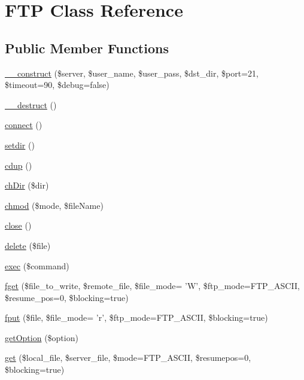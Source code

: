 \hypertarget{class_f_t_p}{\section{F\-T\-P Class Reference}
\label{class_f_t_p}
}
\subsection*{Public Member Functions}
\begin{DoxyCompactItemize}
\item 
\hyperlink{class_f_t_p_a6add9ef3064ccab01141f0c17a4ce7be}{\-\_\-\-\_\-construct} (\$server, \$user\-\_\-name, \$user\-\_\-pass, \$dst\-\_\-dir, \$port=21, \$timeout=90, \$debug=false)
\item 
\hyperlink{class_f_t_p_a421831a265621325e1fdd19aace0c758}{\-\_\-\-\_\-destruct} ()
\item 
\hyperlink{class_f_t_p_a78572828d11dcdf2a498497d9001d557}{connect} ()
\item 
\hyperlink{class_f_t_p_ac0be6f570657571811c15113f0a7a113}{setdir} ()
\item 
\hyperlink{class_f_t_p_a6dd42cc2b9179ca3bdef906e62271369}{cdup} ()
\item 
\hyperlink{class_f_t_p_a166492adbc9cdc0b36a3767ea6d86fae}{ch\-Dir} (\$dir)
\item 
\hyperlink{class_f_t_p_a9ce5eadc6734c7a85ef36354e1da53cb}{chmod} (\$mode, \$file\-Name)
\item 
\hyperlink{class_f_t_p_aa69c8bf1f1dcf4e72552efff1fe3e87e}{close} ()
\item 
\hyperlink{class_f_t_p_a321969477d98aef4154c184217d1c5e0}{delete} (\$file)
\item 
\hyperlink{class_f_t_p_a840b738964f8750ed1e97b94ae3535cb}{exec} (\$command)
\item 
\hyperlink{class_f_t_p_a011dcd276654319156423056282df470}{fget} (\$file\-\_\-to\-\_\-write, \$remote\-\_\-file, \$file\-\_\-mode= 'W', \$ftp\-\_\-mode=F\-T\-P\-\_\-\-A\-S\-C\-I\-I, \$resume\-\_\-pos=0, \$blocking=true)
\item 
\hyperlink{class_f_t_p_a107723a8500942fe1eca0e36e8478480}{fput} (\$file, \$file\-\_\-mode= 'r', \$ftp\-\_\-mode=F\-T\-P\-\_\-\-A\-S\-C\-I\-I, \$blocking=true)
\item 
\hyperlink{class_f_t_p_ae97cabd7c8b25210b82f5253635d247a}{get\-Option} (\$option)
\item 
\hyperlink{class_f_t_p_a44fe996e9697a90fb073f4bb6be24534}{get} (\$local\-\_\-file, \$server\-\_\-file, \$mode=F\-T\-P\-\_\-\-A\-S\-C\-I\-I, \$resumepos=0, \$blocking=true)

\end{DoxyCompactItemize}
